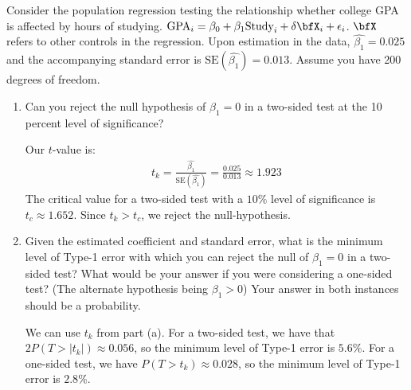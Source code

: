 \documentclass[11pt,twoside,openany]{memoir}
\begin{document}
    \begin{question}
        Consider the population regression testing the relationship whether college GPA is affected by hours of studying. $\text{GPA}_i = \beta_0 + \beta_1 \text{Study}_i + \delta \bfX_i + \epsilon_i$. $\bfX$ refers to other controls in the regression. Upon estimation in the data, $\widehat{\beta_1} = 0.025$ and the accompanying standard error is $\text{SE}(\widehat{\beta_1}) = 0.013$. Assume you have 200 degrees of freedom.
            \begin{enumerate}[label = (\alph*),itemsep=1pt,topsep=3pt]
                \item Can you reject the null hypothesis of $\beta_1 = 0$ in a two-sided test at the 10 percent level of significance?
                    {\color{blue} \begin{solution}
                        Our $t$-value is:
                            \begin{equation*}
                            \begin{split}
                                t_k = \frac{\widehat{\beta_1}}{\text{SE}(\widehat{\beta_1})} = \frac{0.025}{0.013} \approx 1.923
                            \end{split}
                            \end{equation*}
                        The critical value for a two-sided test with a $10\%$ level of significance is $t_c \approx 1.652$. Since $t_k > t_c$, we reject the null-hypothesis.
                    \end{solution}}

                \item Given the estimated coefficient and standard error, what is the minimum level of Type-1 error with which you can reject the null of $\beta_1 = 0$ in a two-sided test? What would be your answer if you were considering a one-sided test? (The alternate hypothesis being $\beta_1 > 0$) Your answer in both instances should be a probability.
                    {\color{blue} \begin{solution}
                        We can use $t_k$ from part (a). For a two-sided test, we have that $2P(T >|t_k|) \approx 0.056$, so the minimum level of Type-1 error is $5.6\%$. For a one-sided test, we have $P(T > t_k) \approx 0.028$, so the minimum level of Type-1 error is $2.8\%$.
                    \end{solution}}


\end{enumerate}
\end{question}
\end{document}
